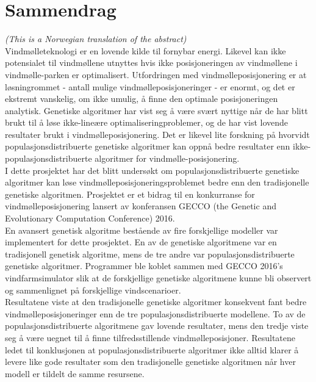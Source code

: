 \section*{Sammendrag}

\noindent \textit{(This is a Norwegian translation of the abstract)}\\

\noindent Vindmølleteknologi er en lovende kilde til fornybar energi. Likevel kan ikke potensialet til vindmøllene utnyttes hvis ikke posisjoneringen av vindmøllene i vindmølle-parken er optimalisert. Utfordringen med vindmølleposisjonering er at løsningrommet - antall mulige vindmølleposisjoneringer - er enormt, og det er ekstremt vanskelig, om ikke umulig, å finne den optimale posisjoneringen analytisk. Genetiske algoritmer har vist seg å være svært nyttige når de har blitt brukt til å løse ikke-lineære optimaliseringproblemer, og de har vist lovende resultater brukt i vindmølleposisjonering. Det er likevel lite forskning på hvorvidt populasjonsdistribuerte genetiske algoritmer kan oppnå bedre resultater enn ikke-populasjonsdistribuerte algoritmer for vindmølle-posisjonering. \\

\noindent I dette prosjektet har det blitt undersøkt om populasjonsdistribuerte genetiske algoritmer kan løse vindmølleposisjoneringsproblemet bedre enn den tradisjonelle genetiske algoritmen. Prosjektet er et bidrag til en konkurranse for vindmølleposisjonering lansert av konferansen GECCO (the Genetic and Evolutionary Computation Conference) 2016.\\
    
\noindent En avansert genetisk algoritme bestående av fire forskjellige modeller var implementert for dette prosjektet. En av de genetiske algoritmene var en tradisjonell genetisk algoritme, mens de tre andre var populasjonsdistribuerte genetiske algoritmer. Programmer ble koblet sammen med GECCO 2016's vindfarmsimulator slik at de forskjellige genetiske algoritmene kunne bli observert og sammenlignet på forskjellige vindscenarioer.\\
    
\noindent Resultatene viste at den tradisjonelle genetiske algoritmer konsekvent fant bedre vindmølleposisjoneringer enn de tre populasjonsdistribuerte modellene. To av de populasjonsdistribuerte algoritmene gav lovende resultater, mens den tredje viste seg å være uegnet til å finne tilfredsstillende vindmølleposisjoner. Resultatene ledet til konklusjonen at populasjonsdistribuerte algoritmer ikke alltid klarer å levere like gode resultater som den tradisjonelle genetiske algoritmen når hver modell er tildelt de samme resursene.\\

\newpage